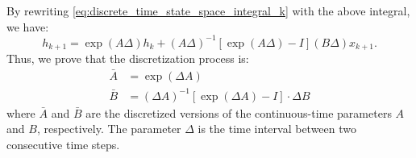 \documentclass[a4paper]{article}
\begin{document}
By rewriting \autoref{eq:discrete_time_state_space_integral_k} with the above integral, we have:
\begin{equation}
    h_{k+1} = \exp(A\Delta) h_k + (A\Delta)^{-1} \left[\exp(A \Delta) - I\right] (B\Delta) x_{k+1}.
\end{equation}
Thus, we prove that the discretization process is:
\begin{align}
    \bar{A} &= \exp(\Delta A) \\
    \bar{B} &= (\Delta A)^{-1} \left[\exp(\Delta A) - I\right] \cdot \Delta B
\end{align}
where $\bar{A}$ and $\bar{B}$ are the discretized versions of the continuous-time parameters $A$ and $B$, respectively. The parameter $\Delta$ is the time interval between two consecutive time steps.

\printbibliography
\end{document}

